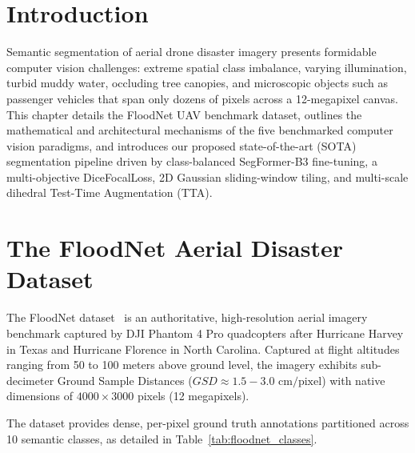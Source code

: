 \label{chap:segmentation_benchmarking}

\section{Introduction}
Semantic segmentation of aerial drone disaster imagery presents formidable computer vision challenges: extreme spatial class imbalance, varying illumination, turbid muddy water, occluding tree canopies, and microscopic objects such as passenger vehicles that span only dozens of pixels across a 12-megapixel canvas. This chapter details the FloodNet UAV benchmark dataset, outlines the mathematical and architectural mechanisms of the five benchmarked computer vision paradigms, and introduces our proposed state-of-the-art (SOTA) segmentation pipeline driven by class-balanced SegFormer-B3 fine-tuning, a multi-objective DiceFocalLoss, 2D Gaussian sliding-window tiling, and multi-scale dihedral Test-Time Augmentation (TTA).

\section{The FloodNet Aerial Disaster Dataset}
The FloodNet dataset~\cite{rahnemoonfar2021floodnet} is an authoritative, high-resolution aerial imagery benchmark captured by DJI Phantom 4 Pro quadcopters after Hurricane Harvey in Texas and Hurricane Florence in North Carolina. Captured at flight altitudes ranging from 50 to 100 meters above ground level, the imagery exhibits sub-decimeter Ground Sample Distances ($GSD \approx 1.5 - 3.0\text{ cm/pixel}$) with native dimensions of $4000 \times 3000$ pixels (12 megapixels).

The dataset provides dense, per-pixel ground truth annotations partitioned across 10 semantic classes, as detailed in Table~\ref{tab:floodnet_classes}.

